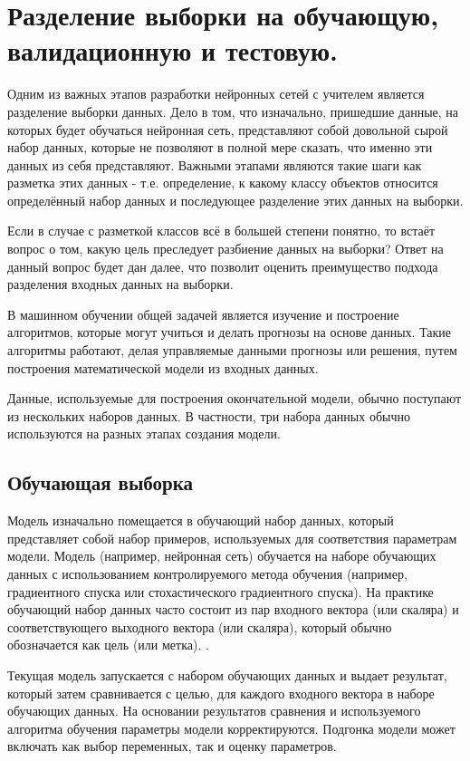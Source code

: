 \section{Разделение выборки на обучающую, валидационную и тестовую.}
\label{sec:purpose}

Одним из важных этапов разработки нейронных сетей с учителем является разделение выборки данных. Дело в том, что изначально, пришедшие данные, на которых будет обучаться нейронная сеть, представляют собой довольной сырой набор данных, которые не позволяют в полной мере сказать, что именно эти данных из себя представляют. Важными этапами являются такие шаги как разметка этих данных - т.е. определение, к какому классу объектов относится определённый набор данных и последующее разделение этих данных на выборки.

Если в случае с разметкой классов всё в большей степени понятно, то встаёт вопрос о том, какую цель преследует разбиение данных на выборки? Ответ на данный вопрос будет дан далее, что позволит оценить преимущество подхода разделения входных данных на выборки.

В машинном обучении общей задачей является изучение и построение алгоритмов, которые могут учиться и делать прогнозы на основе данных. Такие алгоритмы работают, делая управляемые данными прогнозы или решения, путем построения математической модели из входных данных.

Данные, используемые для построения окончательной модели, обычно поступают из нескольких наборов данных. В частности, три набора данных обычно используются на разных этапах создания модели.

\subsection{Обучающая выборка}

Модель изначально помещается в обучающий набор данных, который представляет собой набор примеров, используемых для соответствия параметрам модели. Модель (например, нейронная сеть) обучается на наборе обучающих данных с использованием контролируемого метода обучения (например, градиентного спуска или стохастического градиентного спуска). На практике обучающий набор данных часто состоит из пар входного вектора (или скаляра) и соответствующего выходного вектора (или скаляра), который обычно обозначается как цель (или метка). \cite{tdt}.

Текущая модель запускается с набором обучающих данных и выдает результат, который затем сравнивается с целью, для каждого входного вектора в наборе обучающих данных. На основании результатов сравнения и используемого алгоритма обучения параметры модели корректируются. Подгонка модели может включать как выбор переменных, так и оценку параметров.

